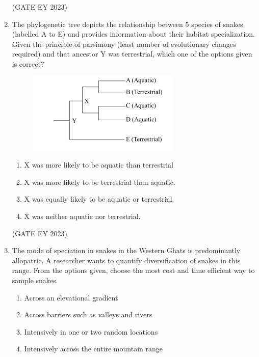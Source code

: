 \documentclass[journal,12pt,onecolumn]{IEEEtran}
\theoremstyle{remark}
\begin{document}
\begin{enumerate}
\begin{enumerate}
\end{enumerate}


\hfill{(GATE EY 2023)}

 \item The phylogenetic tree depicts the relationship between 5 species of snakes
(labelled A to E) and provides information about their habitat specialization.
Given the principle of parsimony (least number of evolutionary changes required)
and that ancestor Y was terrestrial, which one of the options given is correct?
\begin{figure}[H]
    \centering
    \includegraphics[]{figs/Q.46.png}
    \caption{}
    \label{fig:}
\end{figure}
\begin{enumerate}

\item X was more likely to be aquatic than terrestrial
\item X was more likely to be terrestrial than aquatic.
\item X was equally likely to be aquatic or terrestrial.

\item X was neither aquatic nor terrestrial.


\end{enumerate}


\hfill{(GATE EY 2023)}


 \item The mode of speciation in snakes in the Western Ghats is predominantly allopatric.
A researcher wants to quantify diversification of snakes in this range. From the
options given, choose the most cost and time efficient way to sample snakes.
\begin{enumerate}

\item Across an elevational gradient
\item Across barriers such as valleys and rivers
\item Intensively in one or two random locations
\item Intensively across the entire mountain range



\end{enumerate}
\end{enumerate}
\end{document}
